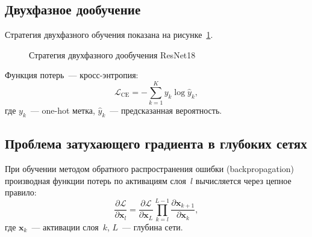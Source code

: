 \documentclass[14pt,a4paper]{report}
\numberwithin{equation}{chapter}
\numberwithin{figure}{chapter}
\numberwithin{table}{chapter}
\begin{document}
\subsection{Двухфазное дообучение}

Стратегия двухфазного обучения показана на рисунке~\ref{fig:twophase}.

\begin{figure}[H]
\centering
{}
\caption{Стратегия двухфазного дообучения ResNet18}
\label{fig:twophase}
\end{figure}

Функция потерь~--- кросс-энтропия:
\begin{equation}
  \mathcal{L}_{\mathrm{CE}} = -\sum_{k=1}^{K} y_k \log \hat{y}_k,
\end{equation}
где $y_k$~--- one-hot метка, $\hat{y}_k$~--- предсказанная вероятность.

\subsection{Проблема затухающего градиента в глубоких сетях}

При обучении методом обратного распространения ошибки (backpropagation)
производная функции потерь по активациям слоя~$l$ вычисляется
через цепное правило:
\begin{equation}
  \frac{\partial\mathcal{L}}{\partial\mathbf{x}_l} =
  \frac{\partial\mathcal{L}}{\partial\mathbf{x}_L}
  \prod_{k=l}^{L-1}
  \frac{\partial\mathbf{x}_{k+1}}{\partial\mathbf{x}_k},
\end{equation}
где $\mathbf{x}_k$~--- активации слоя~$k$, $L$~--- глубина сети.
\end{document}
